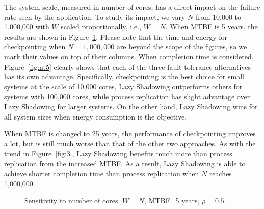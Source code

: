 The system scale, measured in number of cores, has a direct impact on the failure rate seen by the application. To study its impact, we vary $N$ from 10,000 to 1,000,000 with $W$ scaled proportionally, i.e., $W=N$. When MTBF is 5 years, the results are shown in Figure~\ref{fig:n5}. Please note that the time and energy for checkpointing when $N=1,000,000$ are beyond the scope of the figures, so we mark their values on top of their columns. When completion time is considered, Figure~\ref{fig:nt5} clearly shows that each of the three fault tolerance alternatives has its own advantage. Specifically, checkpointing is the best choice for small systems at the scale of 10,000 cores, Lazy Shadowing outperforms others for systems with 100,000 cores, while process replication has slight advantage over Lazy Shadowing for larger systems. On the other hand, Lazy Shadowing wins for all system sizes when energy consumption is the objective. 

When MTBF is changed to 25 years, the performance of checkpointing improves a lot, but is still much worse than that of the other two approaches. As with the trend in Figure~\ref{fig:3}, Lazy Shadowing benefits much more than process replication from the increased MTBF. As a result, Lazy Shadowing is able to achieve shorter completion time than process replication when $N$ reaches 1,000,000.

\begin{figure}[!t]
	\begin{center}
	\end{center}
	\caption{Sensitivity to number of cores. $W=N$, MTBF=5 years, $\rho=0.5$.}
	\label{fig:n5}
\end{figure}

